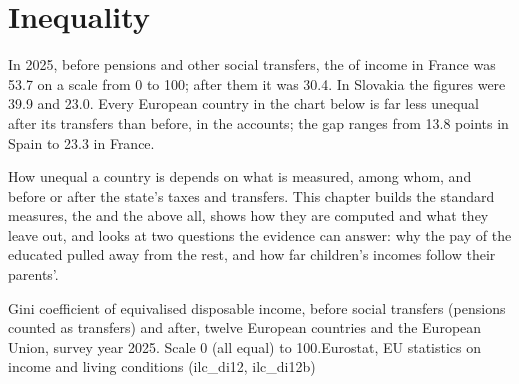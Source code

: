 \chapter{Inequality}\label{ch:g11:inequality}

In 2025, before pensions and other social transfers, the  of income in France was 53.7 on a scale from 0 to 100; after them it was 30.4. In
Slovakia the figures were 39.9 and 23.0. Every European country in the chart below is far less unequal after its transfers than before, in the accounts; the gap ranges from 13.8 points
in Spain to 23.3 in France.

How unequal a country is depends on what is measured, among whom, and before or after the state's taxes and transfers. This chapter builds the standard measures, the
 and the  above all, shows how they are computed and what they leave out, and looks at two questions the evidence can answer: why the pay
of the educated pulled away from the rest, and how far children's incomes follow their parents'.

\begin{openingchart}{Gini coefficient of equivalised disposable income, before social transfers (pensions counted as transfers) and after, twelve European countries and
the European Union, survey year 2025. Scale 0 (all equal) to 100.}{Eurostat, EU statistics on income and living conditions (ilc\_di12, ilc\_di12b)}
\end{openingchart}

